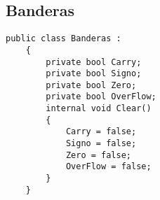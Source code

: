 \documentclass{scrartcl}
\begin{document}
\subsection{Banderas}
\begin{lstlisting}[language={[Sharp]C}, title={Banderas}]
    public class Banderas :
    {
        private bool Carry;    
        private bool Signo;   
        private bool Zero;
        private bool OverFlow;
        internal void Clear()
        {
            Carry = false;
            Signo = false;
            Zero = false;
            OverFlow = false;
        }
    }
\end{lstlisting}
\end{document}
